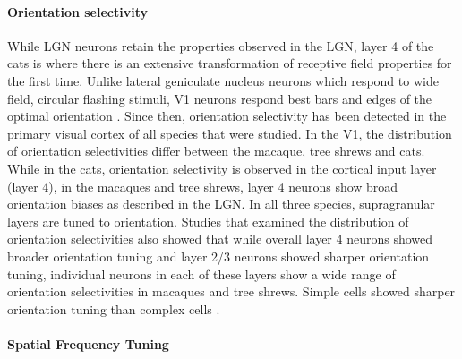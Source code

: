 \paragraph{Orientation selectivity}

While LGN neurons retain the properties observed in the LGN, layer 4 of the cats is where there is an extensive transformation of receptive field properties for the first time. Unlike lateral geniculate nucleus neurons which respond to wide field, circular flashing stimuli, V1 neurons respond best bars and edges of the optimal orientation \cite{Hubel1962d}. Since then, orientation selectivity has been detected in the primary visual cortex of all species that were studied. In the V1, the distribution of orientation selectivities differ between the macaque, tree shrews and cats. While in the cats, orientation selectivity is observed in the cortical input layer (layer 4), in the macaques and tree shrews, layer 4 neurons show broad orientation biases as described in the LGN. In all three species, supragranular layers are tuned to orientation. Studies that examined the distribution of orientation selectivities also showed that while overall layer 4 neurons showed broader orientation tuning and layer 2/3 neurons showed sharper orientation tuning, individual neurons in each of these layers show a wide range of orientation selectivities in macaques and tree shrews. Simple cells showed sharper orientation tuning than complex cells \cite{Henry1974, DeValois1982, Leventhal1978}.




\paragraph{Spatial Frequency Tuning}

